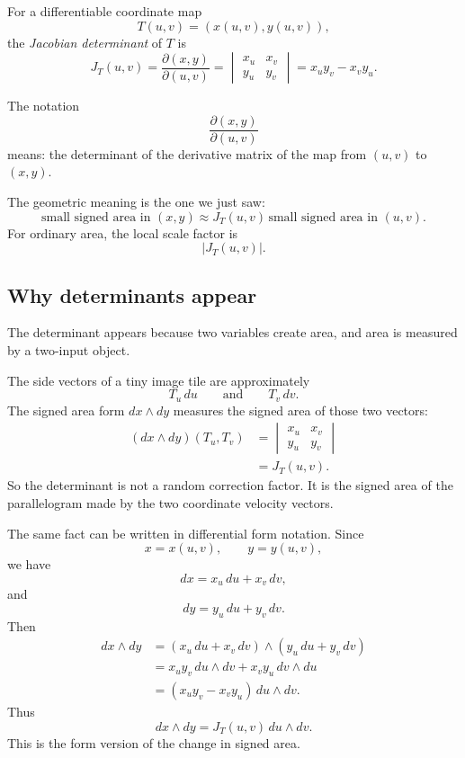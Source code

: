 \begin{definition}
For a differentiable coordinate map
\[
    T(u,v)=(x(u,v),y(u,v)),
\]
the \emph{Jacobian determinant} of \(T\) is
\[
\boxed{
    J_T(u,v)
    =
    \frac{\partial(x,y)}{\partial(u,v)}
    =
    \begin{vmatrix}
        x_u & x_v\\
        y_u & y_v
    \end{vmatrix}
    =
    x_u y_v-x_v y_u.
}
\]
\end{definition}

The notation
\[
    \frac{\partial(x,y)}{\partial(u,v)}
\]
means: the determinant of the derivative matrix of the map from \((u,v)\) to
\((x,y)\).

The geometric meaning is the one we just saw:
\[
\boxed{
    \text{small signed area in }(x,y)
    \approx
    J_T(u,v)\, \text{small signed area in }(u,v).
}
\]
For ordinary area, the local scale factor is
\[
\boxed{
    |J_T(u,v)|.
}
\]

\subsection{Why determinants appear}

The determinant appears because two variables create area, and area is measured by a
two-input object.

The side vectors of a tiny image tile are approximately
\[
    T_u\,du
    \qquad\text{and}\qquad
    T_v\,dv.
\]
The signed area form \(dx\wedge dy\) measures the signed area of those two vectors:
\[
\begin{aligned}
(dx\wedge dy)(T_u,T_v)
&=
\begin{vmatrix}
    x_u & x_v\\
    y_u & y_v
\end{vmatrix}\\
&=
J_T(u,v).
\end{aligned}
\]
So the determinant is not a random correction factor.  It is the signed area of the
parallelogram made by the two coordinate velocity vectors.

The same fact can be written in differential form notation.  Since
\[
    x=x(u,v),
    \qquad
    y=y(u,v),
\]
we have
\[
    dx=x_u\,du+x_v\,dv,
\]
and
\[
    dy=y_u\,du+y_v\,dv.
\]
Then
\[
\begin{aligned}
dx\wedge dy
&=
(x_u\,du+x_v\,dv)\wedge(y_u\,du+y_v\,dv)\\
&=
x_u y_v\,du\wedge dv+x_v y_u\,dv\wedge du\\
&=
(x_u y_v-x_v y_u)\,du\wedge dv.
\end{aligned}
\]
Thus
\[
\boxed{
    dx\wedge dy
    =
    J_T(u,v)\,du\wedge dv.
}
\]
This is the form version of the change in signed area.

